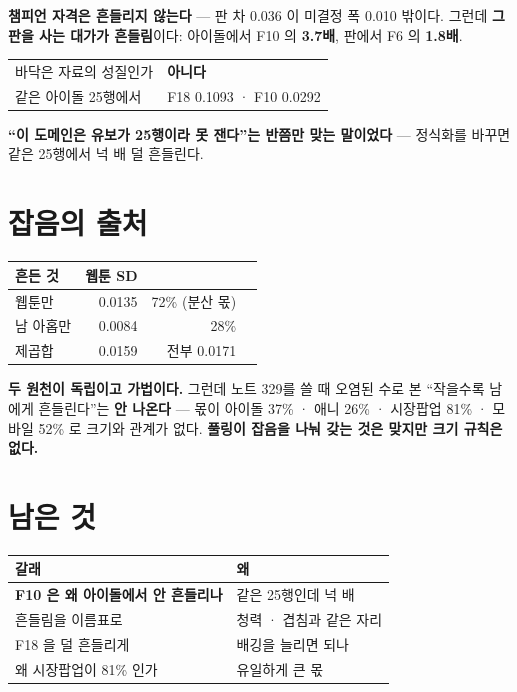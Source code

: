 \documentclass[10pt]{article}
\begin{document}
\textbf{챔피언 자격은 흔들리지 않는다} --- 판 차 0.036 이 미결정 폭 0.010
밖이다. 그런데 \textbf{그 판을 사는 대가가 흔들림}이다: 아이돌에서 F10 의
\textbf{3.7배}, 판에서 F6 의 \textbf{1.8배}.

\begin{center}\small
\begin{tabular}{ll}
\hline
바닥은 자료의 성질인가 & \textbf{아니다} \\
같은 아이돌 25행에서 & F18 0.1093 · F10 0.0292 \\
\hline
\end{tabular}
\end{center}

\textbf{``이 도메인은 유보가 25행이라 못 잰다''는 반쯤만 맞는 말이었다} ---
정식화를 바꾸면 같은 25행에서 넉 배 덜 흔들린다.

\section{잡음의 출처}

\begin{center}\footnotesize
\begin{tabular}{lrrr}
\hline
흔든 것 & 웹툰 SD & \\
\hline
웹툰만 & 0.0135 & 72\% (분산 몫) \\
남 아홉만 & 0.0084 & 28\% \\
제곱합 & 0.0159 & 전부 0.0171 \\
\hline
\end{tabular}
\end{center}

\textbf{두 원천이 독립이고 가법이다.} 그런데 노트 329를 쓸 때 오염된
수로 본 ``작을수록 남에게 흔들린다''는 \textbf{안 나온다} --- 몫이
아이돌 37\% · 애니 26\% · 시장팝업 81\% · 모바일 52\% 로 크기와 관계가
없다. \textbf{풀링이 잡음을 나눠 갖는 것은 맞지만 크기 규칙은 없다.}

\section{남은 것}
\begin{center}\footnotesize
\begin{tabular}{ll}
\hline
갈래 & 왜 \\
\hline
\textbf{F10 은 왜 아이돌에서 안 흔들리나} & 같은 25행인데 넉 배 \\
흔들림을 이름표로 & 청력 · 겹침과 같은 자리 \\
F18 을 덜 흔들리게 & 배깅을 늘리면 되나 \\
왜 시장팝업이 81\% 인가 & 유일하게 큰 몫 \\
\hline
\end{tabular}
\end{center}
\end{document}
